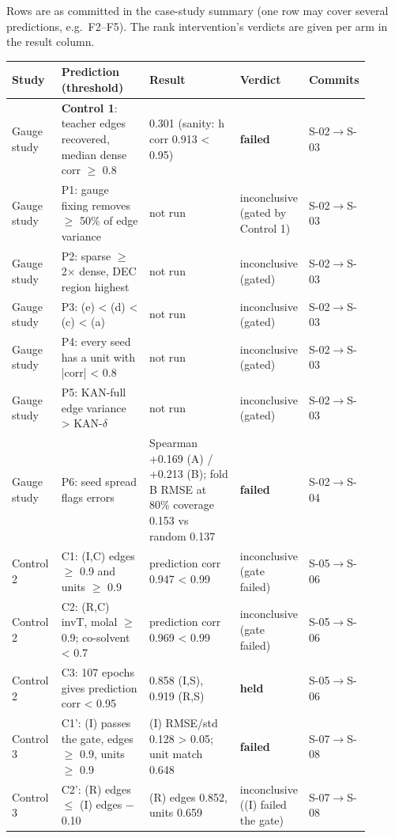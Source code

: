 Rows are as committed in the case-study summary (one row may cover several predictions, e.g.\ F2--F5). The rank intervention's verdicts are given per arm in the result column.

{\footnotesize\setlength{\tabcolsep}{3pt}
\begin{longtable}{R{0.14\linewidth} R{0.26\linewidth} R{0.29\linewidth} R{0.10\linewidth} R{0.11\linewidth}}
\toprule
Study & Prediction (threshold) & Result & Verdict & Commits \\
\midrule
\endhead
Gauge study & \textbf{Control 1}: teacher edges recovered, median dense corr $\geq$ 0.8 & 0.301 (sanity: h corr 0.913 < 0.95) & \textbf{failed} & S-02$\to$\allowbreak{}S-03 \\
Gauge study & P1: gauge fixing removes $\geq$ 50\% of edge variance & not run & inconclusive (gated by Control 1) & S-02$\to$\allowbreak{}S-03 \\
Gauge study & P2: sparse $\geq$ 2$\times$ dense, DEC region highest & not run & inconclusive (gated) & S-02$\to$\allowbreak{}S-03 \\
Gauge study & P3: (e) < (d) < (c) < (a) & not run & inconclusive (gated) & S-02$\to$\allowbreak{}S-03 \\
Gauge study & P4: every seed has a unit with |corr| < 0.8 & not run & inconclusive (gated) & S-02$\to$\allowbreak{}S-03 \\
Gauge study & P5: KAN-full edge variance > KAN-$\delta$ & not run & inconclusive (gated) & S-02$\to$\allowbreak{}S-03 \\
Gauge study & P6: seed spread flags errors & Spearman +0.169 (A) / +0.213 (B); fold B RMSE at 80\% coverage 0.153 vs random 0.137 & \textbf{failed} & S-02$\to$\allowbreak{}S-04 \\
Control 2 & C1: (I,C) edges $\geq$ 0.9 and units $\geq$ 0.9 & prediction corr 0.947 < 0.99 & inconclusive (gate failed) & S-05$\to$\allowbreak{}S-06 \\
Control 2 & C2: (R,C) invT, molal $\geq$ 0.9; co-solvent < 0.7 & prediction corr 0.969 < 0.99 & inconclusive (gate failed) & S-05$\to$\allowbreak{}S-06 \\
Control 2 & C3: 107 epochs gives prediction corr < 0.95 & 0.858 (I,S), 0.919 (R,S) & \textbf{held} & S-05$\to$\allowbreak{}S-06 \\
Control 3 & C1': (I) passes the gate, edges $\geq$ 0.9, units $\geq$ 0.9 & (I) RMSE/std 0.128 > 0.05; unit match 0.648 & \textbf{failed} & S-07$\to$\allowbreak{}S-08 \\
Control 3 & C2': (R) edges $\leq$ (I) edges $-$ 0.10 & (R) edges 0.852, units 0.659 & inconclusive ((I) failed the gate) & S-07$\to$\allowbreak{}S-08 \\

\end{longtable}}
